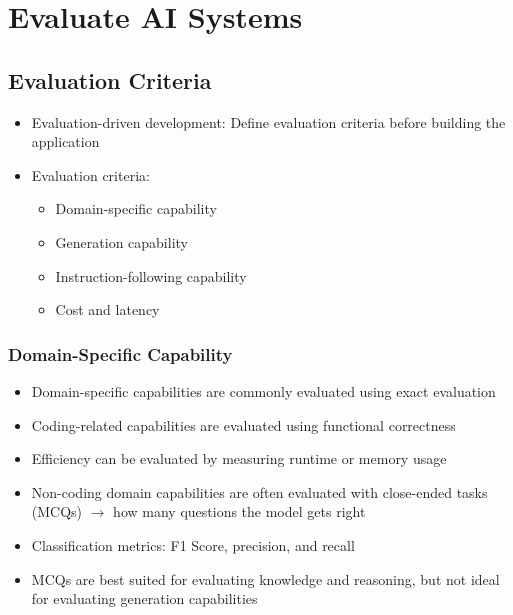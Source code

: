 \documentclass[11pt]{scrartcl}
\begin{document}
\section*{Evaluate AI Systems}
\subsection*{Evaluation Criteria}
\begin{itemize}
	\item Evaluation-driven development: Define evaluation criteria before building the application
	\item Evaluation criteria:
	\begin{itemize}
		\item Domain-specific capability
		\item Generation capability
		\item Instruction-following capability
		\item Cost and latency
	\end{itemize}
\end{itemize}

\subsubsection*{Domain-Specific Capability}
\begin{itemize}
	\item Domain-specific capabilities are commonly evaluated using exact evaluation
	\item Coding-related capabilities are evaluated using functional correctness
	\item Efficiency can be evaluated by measuring runtime or memory usage
	\item Non-coding domain capabilities are often evaluated with close-ended tasks (MCQs) $\to$ how many questions the model gets right
	\item Classification metrics: F1 Score, precision, and recall
	\item MCQs are best suited for evaluating knowledge and reasoning, but not ideal for evaluating generation capabilities
\end{itemize}
\end{document}
